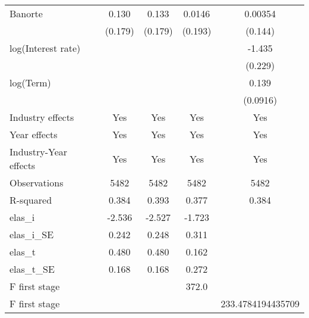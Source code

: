 {\begin{tabular}{l*{4}{c}}
Banorte         &    0.130         &    0.133         &   0.0146         &  0.00354         \\
                &  (0.179)         &  (0.179)         &  (0.193)         &  (0.144)         \\
log(Interest rate)&                  &                  &                  &   -1.435\sym{***}\\
                &                  &                  &                  &  (0.229)         \\
log(Term)       &                  &                  &                  &    0.139         \\
                &                  &                  &                  & (0.0916)         \\
Industry effects &      Yes         &      Yes         &      Yes         &      Yes         \\
Year effects    &      Yes         &      Yes         &      Yes         &      Yes         \\
Industry-Year effects &      Yes         &      Yes         &      Yes         &      Yes         \\
\hline
Observations    &     5482         &     5482         &     5482         &     5482         \\
R-squared       &    0.384         &    0.393         &    0.377         &    0.384         \\
elas_i          &   -2.536         &   -2.527         &   -1.723         &                  \\
elas_i_SE       &    0.242         &    0.248         &    0.311         &                  \\
elas_t          &    0.480         &    0.480         &    0.162         &                  \\
elas_t_SE       &    0.168         &    0.168         &    0.272         &                  \\
F first stage   &                  &                  &    372.0         &                  \\
F first stage   &                  &                  &                  &233.4784194435709         \\
\hline\hline
\end{tabular}
}
